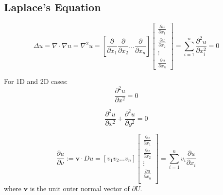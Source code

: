 \documentclass{blog}
\begin{document}
\subsection{Laplace's Equation}
\begin{definition}
    \begin{equation}
        \label{eq:laplace-equation}
        \Delta u = \nabla \cdot \nabla u = \nabla^{2} u =
        \left[ \frac{\partial}{\partial x_{1}} \frac{\partial}{\partial x_{2}} \dots \frac{\partial}{\partial x_{n}} \right]
        \begin{bmatrix}
            \frac{\partial u}{\partial x_{1}} \\
            \frac{\partial u}{\partial x_{2}} \\
            \vdots                            \\
            \frac{\partial u}{\partial x_{n}}
        \end{bmatrix}
        = \sum_{i=1}^{n} \frac{\partial^{2} u}{\partial x_{i}^{2}} = 0
    \end{equation}
\end{definition}

\begin{example}
    For 1D and 2D cases:
    \begin{equation*}
        \frac{\partial^2 u}{\partial x^{2}} = 0
    \end{equation*}

    \begin{equation*}
        \frac{\partial^2 u}{\partial x^{2}} + \frac{\partial^2 u}{\partial y^{2}} = 0
    \end{equation*}
\end{example}

\begin{definition}
    \begin{equation*}
        \frac{\partial u}{\partial v} := \boldsymbol{v} \cdot Du =
        [v_{1} v_{2} \dots v_{n}]
        \begin{bmatrix}
            \frac{\partial u}{\partial x_{1}} \\
            \frac{\partial u}{\partial x_{2}} \\
            \vdots                            \\
            \frac{\partial u}{\partial x_{n}} \\
        \end{bmatrix}
        = \sum_{i=1}^{n} v_{i} \frac{\partial u}{\partial x_{i}}
    \end{equation*}
    where $\boldsymbol{v}$ is the unit outer normal vector of $\partial U$.
\end{definition}
\end{document}
